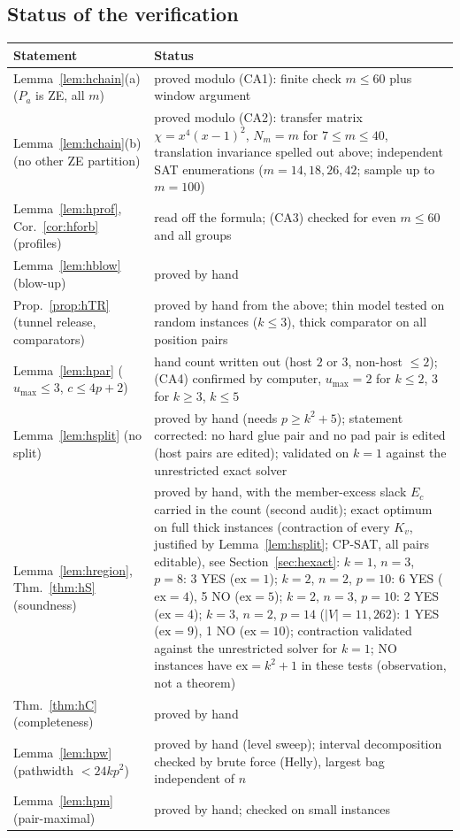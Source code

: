 \subsection{Status of the verification}\label{sec:hstatus}
\begin{center}
\small
\begin{tabular}{@{}p{}p{}@{}}
\hline
Statement & Status\\\hline
Lemma~\ref{lem:hchain}(a) ($P_a$ is ZE, all $m$) & proved modulo (CA1): finite check $m\le60$ plus window argument\\
Lemma~\ref{lem:hchain}(b) (no other ZE partition) & proved modulo (CA2): transfer matrix $\chi=x^4(x-1)^2$, $N_m=m$ for $7\le m\le40$, translation invariance spelled out above; independent SAT enumerations ($m=14,18,26,42$; sample up to $m=100$)\\
Lemma~\ref{lem:hprof}, Cor.~\ref{cor:hforb} (profiles) & read off the formula; (CA3) checked for even $m\le60$ and all groups\\
Lemma~\ref{lem:hblow} (blow-up) & proved by hand\\
Prop.~\ref{prop:hTR} (tunnel release, comparators) & proved by hand from the above; thin model tested on random instances ($k\le3$), thick comparator on all position pairs\\
Lemma~\ref{lem:hpar} ($u_{\max}\le3$, $c\le4p+2$) & hand count written out (host $2$ or $3$, non-host $\le2$); (CA4) confirmed by computer, $u_{\max}=2$ for $k\le2$, $3$ for $k\ge3$, $k\le5$\\
Lemma~\ref{lem:hsplit} (no split) & proved by hand (needs $p\ge k^2+5$); statement corrected: no hard glue pair and no pad pair is edited (host pairs are edited); validated on $k=1$ against the unrestricted exact solver\\
Lemma~\ref{lem:hregion}, Thm.~\ref{thm:hS} (soundness) & proved by hand, with the member-excess slack $E_c$ carried in the count (second audit); exact optimum on full thick instances (contraction of every $K_v$, justified by Lemma~\ref{lem:hsplit}; CP-SAT, all pairs editable), see Section~\ref{sec:hexact}: $k=1$, $n=3$, $p=8$: 3 YES ($\mathrm{ex}=1$); $k=2$, $n=2$, $p=10$: 6 YES ($\mathrm{ex}=4$), 5 NO ($\mathrm{ex}=5$); $k=2$, $n=3$, $p=10$: 2 YES ($\mathrm{ex}=4$); $k=3$, $n=2$, $p=14$ ($|V|=11{,}262$): 1 YES ($\mathrm{ex}=9$), 1 NO ($\mathrm{ex}=10$); contraction validated against the unrestricted solver for $k=1$; NO instances have $\mathrm{ex}=k^2+1$ in these tests (observation, not a theorem)\\
Thm.~\ref{thm:hC} (completeness) & proved by hand\\
Lemma~\ref{lem:hpw} (pathwidth $<24kp^2$) & proved by hand (level sweep); interval decomposition checked by brute force (Helly), largest bag independent of $n$\\
Lemma~\ref{lem:hpm} (pair-maximal) & proved by hand; checked on small instances\\\hline
\end{tabular}
\end{center}
